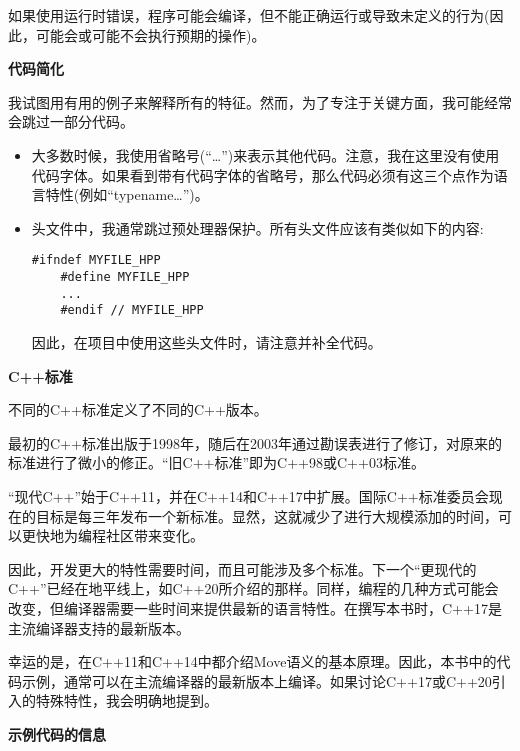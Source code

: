 如果使用运行时错误，程序可能会编译，但不能正确运行或导致未定义的行为(因此，可能会或可能不会执行预期的操作)。\par

\hspace*{\fill} \par %
\textbf{代码简化}

我试图用有用的例子来解释所有的特征。然而，为了专注于关键方面，我可能经常会跳过一部分代码。\par

\begin{itemize}
	\item 大多数时候，我使用省略号(“…”)来表示其他代码。注意，我在这里没有使用代码字体。如果看到带有代码字体的省略号，那么代码必须有这三个点作为语言特性(例如“typename…”)。
	\item 头文件中，我通常跳过预处理器保护。所有头文件应该有类似如下的内容:
	\begin{lstlisting}[caption={}]
	#ifndef MYFILE_HPP
	#define MYFILE_HPP
	...
	#endif // MYFILE_HPP
	\end{lstlisting}
	因此，在项目中使用这些头文件时，请注意并补全代码。
\end{itemize}

\hspace*{\fill} \par %
\textbf{C++标准}

不同的C++标准定义了不同的C++版本。\par

最初的C++标准出版于1998年，随后在2003年通过勘误表进行了修订，对原来的标准进行了微小的修正。“旧C++标准”即为C++98或C++03标准。\par

“现代C++”始于C++11，并在C++14和C++17中扩展。国际C++标准委员会现在的目标是每三年发布一个新标准。显然，这就减少了进行大规模添加的时间，可以更快地为编程社区带来变化。\par

因此，开发更大的特性需要时间，而且可能涉及多个标准。下一个“更现代的C++”已经在地平线上，如C++20所介绍的那样。同样，编程的几种方式可能会改变，但编译器需要一些时间来提供最新的语言特性。在撰写本书时，C++17是主流编译器支持的最新版本。\par

幸运的是，在C++11和C++14中都介绍Move语义的基本原理。因此，本书中的代码示例，通常可以在主流编译器的最新版本上编译。如果讨论C++17或C++20引入的特殊特性，我会明确地提到。\par

\hspace*{\fill} \par %
\textbf{示例代码的信息}

